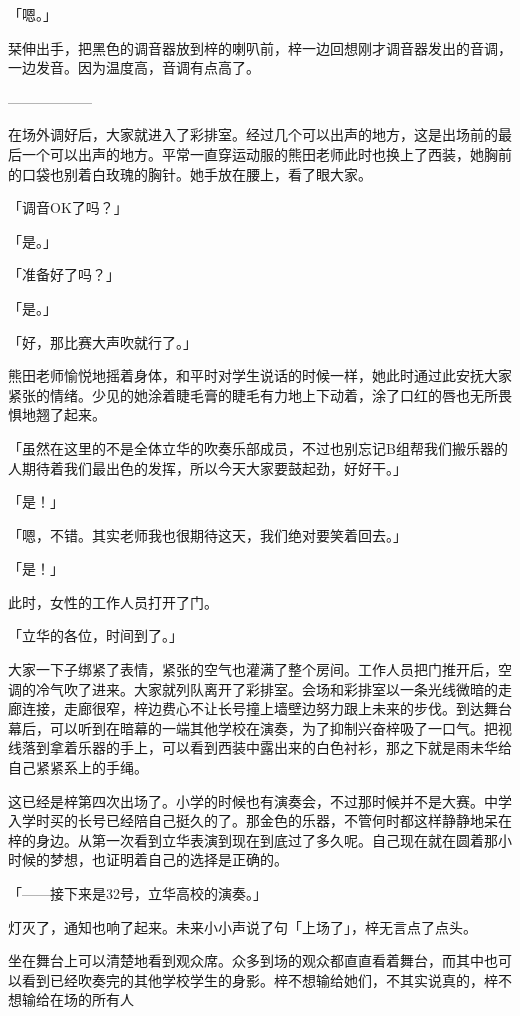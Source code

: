 \documentclass[UTF8]{ctexart}
\begin{document}
    「嗯。」

    栞伸出手，把黑色的调音器放到梓的喇叭前，梓一边回想刚才调音器发出的音调，一边发音。因为温度高，音调有点高了。

    ——————

    在场外调好后，大家就进入了彩排室。经过几个可以出声的地方，这是出场前的最后一个可以出声的地方。平常一直穿运动服的熊田老师此时也换上了西装，她胸前的口袋也别着白玫瑰的胸针。她手放在腰上，看了眼大家。

    「调音OK了吗？」

    「是。」

    「准备好了吗？」

    「是。」

    「好，那比赛大声吹就行了。」

    熊田老师愉悦地摇着身体，和平时对学生说话的时候一样，她此时通过此安抚大家紧张的情绪。少见的她涂着睫毛膏的睫毛有力地上下动着，涂了口红的唇也无所畏惧地翘了起来。

    「虽然在这里的不是全体立华的吹奏乐部成员，不过也别忘记B组帮我们搬乐器的人期待着我们最出色的发挥，所以今天大家要鼓起劲，好好干。」

    「是！」

    「嗯，不错。其实老师我也很期待这天，我们绝对要笑着回去。」

    「是！」

    此时，女性的工作人员打开了门。

    「立华的各位，时间到了。」

    大家一下子绑紧了表情，紧张的空气也灌满了整个房间。工作人员把门推开后，空调的冷气吹了进来。大家就列队离开了彩排室。会场和彩排室以一条光线微暗的走廊连接，走廊很窄，梓边费心不让长号撞上墙壁边努力跟上未来的步伐。到达舞台幕后，可以听到在暗幕的一端其他学校在演奏，为了抑制兴奋梓吸了一口气。把视线落到拿着乐器的手上，可以看到西装中露出来的白色衬衫，那之下就是雨未华给自己紧紧系上的手绳。

    这已经是梓第四次出场了。小学的时候也有演奏会，不过那时候并不是大赛。中学入学时买的长号已经陪自己挺久的了。那金色的乐器，不管何时都这样静静地呆在梓的身边。从第一次看到立华表演到现在到底过了多久呢。自己现在就在圆着那小时候的梦想，也证明着自己的选择是正确的。

    「——接下来是32号，立华高校的演奏。」

    灯灭了，通知也响了起来。未来小小声说了句「上场了」，梓无言点了点头。

    坐在舞台上可以清楚地看到观众席。众多到场的观众都直直看着舞台，而其中也可以看到已经吹奏完的其他学校学生的身影。梓不想输给她们，不其实说真的，梓不想输给在场的所有人
\end{document}
